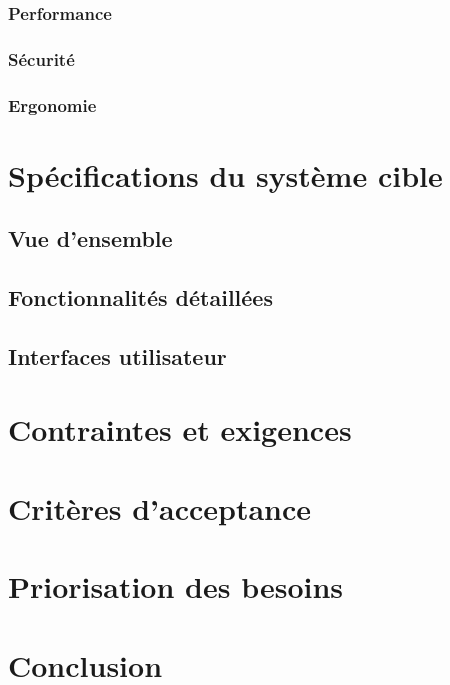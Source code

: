 \subsubsection{Performance}

\subsubsection{Sécurité}

\subsubsection{Ergonomie}

\section{Spécifications du système cible}

\subsection{Vue d'ensemble}

\subsection{Fonctionnalités détaillées}

\subsection{Interfaces utilisateur}

\section{Contraintes et exigences}

\section{Critères d'acceptance}

\section{Priorisation des besoins}

\section{Conclusion}